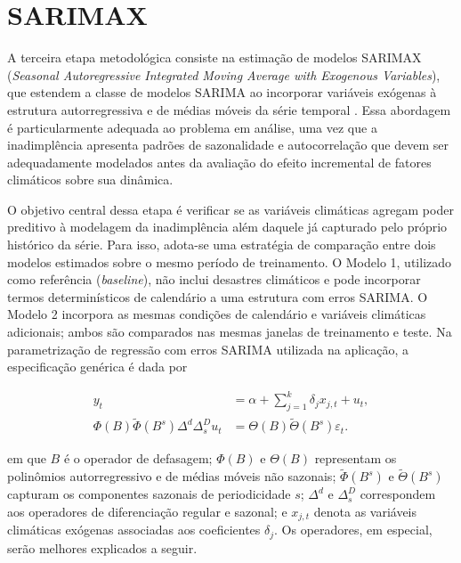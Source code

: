 \section{SARIMAX}

A terceira etapa metodológica consiste na estimação de modelos SARIMAX (\textit{Seasonal Autoregressive Integrated Moving Average with Exogenous Variables}), que estendem a classe de modelos SARIMA ao incorporar variáveis exógenas à estrutura autorregressiva e de médias móveis da série temporal \citep{box2015}. Essa abordagem é particularmente adequada ao problema em análise, uma vez que a inadimplência apresenta padrões de sazonalidade e autocorrelação que devem ser adequadamente modelados antes da avaliação do efeito incremental de fatores climáticos sobre sua dinâmica.

O objetivo central dessa etapa é verificar se as variáveis climáticas agregam poder preditivo à modelagem da inadimplência além daquele já capturado pelo próprio histórico da série. Para isso, adota-se uma estratégia de comparação entre dois modelos estimados sobre o mesmo período de treinamento. O Modelo 1, utilizado como referência (\textit{baseline}), não inclui desastres climáticos e pode incorporar termos determinísticos de calendário a uma estrutura com erros SARIMA. O Modelo 2 incorpora as mesmas condições de calendário e variáveis climáticas adicionais; ambos são comparados nas mesmas janelas de treinamento e teste. Na parametrização de regressão com erros SARIMA utilizada na aplicação, a especificação genérica é dada por

\begin{equation}
\begin{aligned}
 y_t &= \alpha + \sum_{j=1}^{k}\delta_j x_{j,t} + u_t,\\
 \Phi(B)\tilde{\Phi}(B^s)\Delta^d\Delta_s^D u_t &=
 \Theta(B)\tilde{\Theta}(B^s)\varepsilon_t.
\end{aligned}
\end{equation}

\noindent em que $B$ é o operador de defasagem; $\Phi(B)$ e $\Theta(B)$ representam os polinômios autorregressivo e de médias móveis não sazonais; $\tilde{\Phi}(B^s)$ e $\tilde{\Theta}(B^s)$ capturam os componentes sazonais de periodicidade $s$; $\Delta^d$ e $\Delta_s^D$ correspondem aos operadores de diferenciação regular e sazonal; e $x_{j,t}$ denota as variáveis climáticas exógenas associadas aos coeficientes $\delta_j$. Os operadores, em especial, serão melhores explicados a seguir. 

